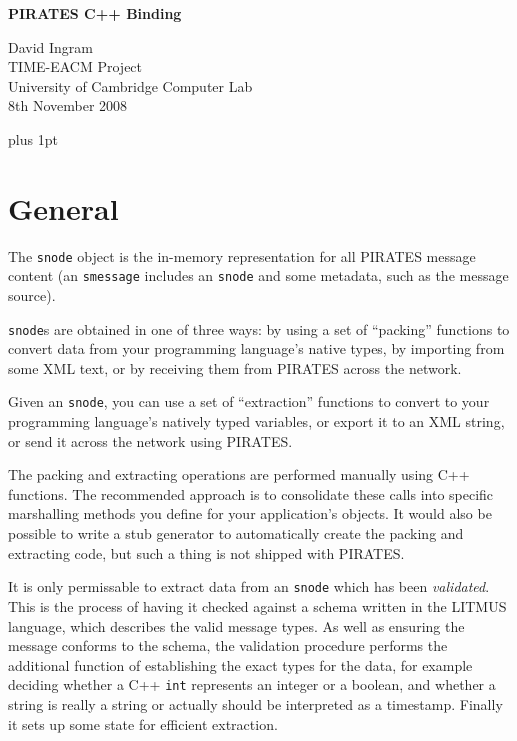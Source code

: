\documentclass[12pt,a4paper,twoside]{article}
\renewcommand{\_}{\texttt{\symbol{95}}}
\begin{document}
\centerline{\textbf{\LARGE PIRATES C++ Binding}}
\begin{center} \large
David Ingram\\
TIME-EACM Project\\
University of Cambridge Computer Lab\\
8th November 2008\\
\end{center}

{ \parskip 1mm plus 1pt \tableofcontents }
\pagestyle{fancy}

\section{General}

The \verb^snode^ object is the in-memory representation
for all PIRATES message content (an \verb^smessage^ includes
an \verb^snode^ and some metadata, such as the message source).

\verb^snode^s are obtained in one of three ways: by using a
set of ``packing'' functions to convert data from your programming
language's native types, by importing from some XML text, or by receiving
them from PIRATES across the network.

Given an \verb^snode^, you can use a set of ``extraction''
functions to convert to your programming language's natively
typed variables, or export it to an XML string, or send it
across the network using PIRATES.

The packing and extracting operations are
performed manually using C++ functions. The recommended approach is to
consolidate these calls into specific marshalling methods you define
for your application's objects. It would also be possible to write
a stub generator to automatically create the packing and extracting
code, but such a thing is not shipped with PIRATES.

It is only permissable to extract data from an \verb^snode^ which has
been \textit{validated}. This is the process of having it checked
against a schema written in the LITMUS language, which describes
the valid message types.
As well as ensuring the message conforms to the schema, the validation
procedure performs the additional function of establishing the exact
types for the data, for example deciding whether a C++
\verb^int^ represents an integer or a boolean, and whether a string
is really a string or actually should be interpreted as a timestamp.
Finally it sets up some state for efficient extraction.
\end{document}
